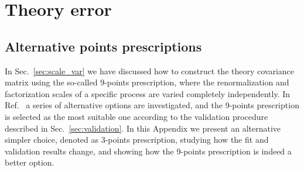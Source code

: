 \chapter{Theory error}
\section{Alternative points prescriptions}
In Sec.~\ref{sec:scale_var} we have discussed how to construct the theory covariance matrix using the so-called 9-points prescription, 
where the renormalization and factorization scales of a specific process are varied completely independently.
In Ref.~\cite{AbdulKhalek:2019ihb} a series of alternative options are investigated, and the 9-points prescription is selected 
as the most suitable one according to the validation procedure described in Sec.~\ref{sec:validation}.
In this Appendix we present an alternative simpler choice, denoted as 3-points prescription,
studying how the fit and validation results change, and showing how the 9-points prescription is indeed a better option. 

